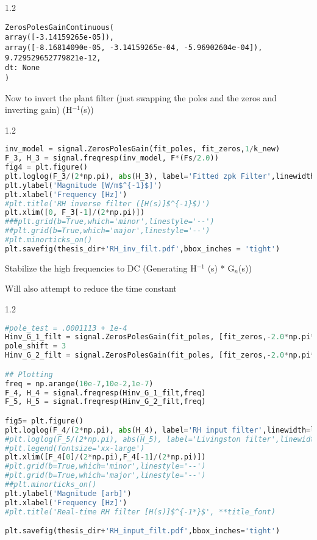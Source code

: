 \begin{spacing}{1.2} \begin{lstlisting}[frame=single]
ZerosPolesGainContinuous(
array([-3.14159265e-05]),
array([-8.16814090e-05, -3.14159265e-04, -5.96902604e-04]),
9.729529652779821e-12,
dt: None
)
\end{lstlisting} \end{spacing}

\noindent Now to invert the plant filter (just swapping the poles and the zeros and inverting gain)
(H\(^{-1}\)(s))

\begin{spacing}{1.2} \begin{lstlisting}[frame=single,language=Python]
inv_model = signal.ZerosPolesGain(fit_poles, fit_zeros,1/k_new)
F_3, H_3 = signal.freqresp(inv_model, F*(Fs/2.0))
fig4 = plt.figure()
plt.loglog(F_3/(2*np.pi), abs(H_3), label='Fitted zpk Filter',linewidth=lin_thickness)
plt.ylabel('Magnitude [W/m$^{-1}$]')
plt.xlabel('Frequency [Hz]')
#plt.title('RH inverse filter ([H(s)]$^{-1}$)')
plt.xlim([0, F_3[-1]/(2*np.pi)])
###plt.grid(b=True,which='minor',linestyle='--')
##plt.grid(b=True,which='major',linestyle='--')
#plt.minorticks_on()
plt.savefig(thesis_dir+'RH_inv_filt.pdf',bbox_inches = 'tight')
\end{lstlisting} \end{spacing}


\noindent Stabilize the high frequencies to DC (Generating H\(^{-1}\) (s) * G\(_{n}\)(s))

\noindent Will also attempt to reduce the time constant

\begin{spacing}{1.2} \begin{lstlisting}[frame=single,language=Python]
#pole_test = .0001113 + 1e-4
Hinv_G_1_filt = signal.ZerosPolesGain(fit_poles, [fit_zeros,-2.0*np.pi*.0001113129672, -2.0*np.pi*.0001113129672],1)
pole_shift = 3
Hinv_G_2_filt = signal.ZerosPolesGain(fit_poles, [fit_zeros,-2.0*np.pi*.0001113129672*pole_shift, -2.0*np.pi*.0001113129672*pole_shift],1)

## Plotting
freq = np.arange(10e-7,10e-2,1e-7)
F_4, H_4 = signal.freqresp(Hinv_G_1_filt,freq)
F_5, H_5 = signal.freqresp(Hinv_G_2_filt,freq)

fig5= plt.figure()
plt.loglog(F_4/(2*np.pi), abs(H_4), label='RH input filter',linewidth=lin_thickness)
#plt.loglog(F_5/(2*np.pi), abs(H_5), label='Livingston filter',linewidth=lin_thickness)
#plt.legend(fontsize='xx-large')
plt.xlim([F_4[0]/(2*np.pi),F_4[-1]/(2*np.pi)])
#plt.grid(b=True,which='minor',linestyle='--')
#plt.grid(b=True,which='major',linestyle='--')
##plt.minorticks_on()
plt.ylabel('Magnitude [arb]')
plt.xlabel('Frequency [Hz]')
#plt.title('Real-time RH filter [H(s)]$^{-1*}$', **title_font)

plt.savefig(thesis_dir+'RH_input_filt.pdf',bbox_inches='tight')
\end{lstlisting} \end{spacing}

